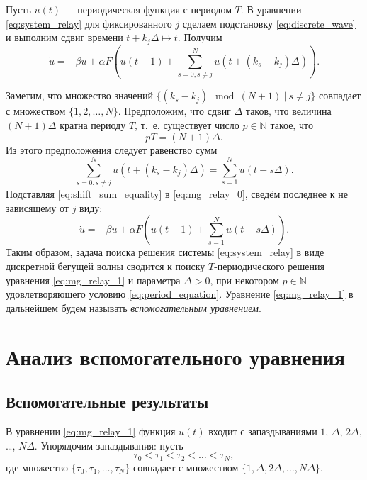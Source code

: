 Пусть $u(t)$ --- периодическая функция с периодом $T$. В уравнении \eqref{eq:system_relay} для фиксированного $j$ сделаем подстановку \eqref{eq:discrete_wave} и выполним сдвиг времени $t + k_j \Delta \mapsto t$. Получим
%
\begin{equation}
	\label{eq:mg_relay_0}
	\dot{u} = -\beta u + \alpha F\left(u(t-1)+ \sum_{s=0, s\neq j}^{N}u(t+(k_s-k_j)\Delta)\right).
\end{equation}

Заметим, что множество значений $\{(k_s - k_j) \mod (N + 1) \ | \ s \neq j\}$ совпадает с множеством $\{1, 2, \ldots, N\}$. Предположим, что сдвиг $\Delta$ таков, что величина $(N + 1) \Delta$ кратна периоду $T$, т.~е. существует число $p \in \mathbb{N}$ такое, что
%
\begin{equation}
	\label{eq:period_equation}
	pT = (N + 1)\Delta.
\end{equation}
%
Из этого предположения следует равенство сумм
%
\begin{equation}
	\label{eq:shift_sum_equality}
	\sum\limits_{s=0, s\neq j}^{N}u(t+(k_s-k_j)\Delta)=\sum\limits_{s=1}^{N}u(t-s\Delta).
\end{equation}
%
Подставляя \eqref{eq:shift_sum_equality} в \eqref{eq:mg_relay_0}, сведём последнее к не зависящему от $j$ виду:
%
\begin{equation}
	\label{eq:mg_relay_1}
	\dot{u}=-\beta u+\alpha F\left(u(t-1)+ \sum_{s=1}^{N}u(t-s\Delta)\right).
\end{equation}
%
Таким образом, задача поиска решения системы \eqref{eq:system_relay} в виде дискретной бегущей волны сводится к поиску $T$-периодического решения уравнения \eqref{eq:mg_relay_1} и параметра $\Delta > 0$, при некотором $p \in \mathbb{N}$ удовлетворяющего условию \eqref{eq:period_equation}. Уравнение \eqref{eq:mg_relay_1} в дальнейшем будем называть \emph{вспомогательным уравнением}.

\section{Анализ вспомогательного уравнения}\label{sec:ch2/sect2}

\subsection{Вспомогательные результаты}\label{sec:ch2/sect2/subsect_aux_result}

В уравнении \eqref{eq:mg_relay_1} функция $u(t)$ входит с запаздываниями $1$, $\Delta$, $2\Delta$, \dots, $N\Delta$. Упорядочим запаздывания: пусть
$$\tau_0 < \tau_1 < \tau_2 < \ldots < \tau_N,$$
где множество $\{\tau_0, \tau_1, \ldots, \tau_N\}$ совпадает с множеством $\{1, \Delta, 2\Delta, \ldots, N\Delta\}$.

